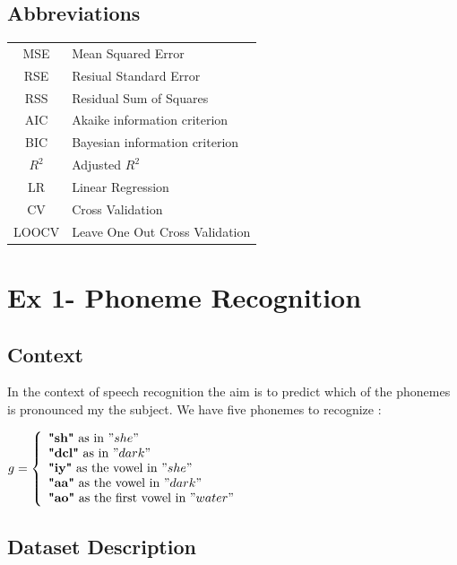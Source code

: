 \documentclass[]{report}
\begin{document}
\tableofcontents
\newpage
\section{Abbreviations}
\begin{center}
\begin{tabular}{ c| l }
	MSE & Mean Squared Error \\
	RSE & Resiual Standard Error\\ 
	RSS & Residual Sum of Squares \\
	AIC & Akaike information criterion \\
	BIC & Bayesian information criterion \\
	$R^{2}$ & Adjusted $R^{2}$ \\
	LR & Linear Regression \\
	CV & Cross Validation \\
	LOOCV & Leave One Out Cross Validation \\
	
\end{tabular}
\end{center}

\chapter{Ex 1- Phoneme Recognition}
\section{Context}
In the context of speech recognition the aim is to predict which of the phonemes is pronounced my the subject. We have five phonemes to recognize :\\ 
\begin{center}
	$g = \left\{
	\begin{array}{l}
	\textbf{"sh"} \text{ as in } "she" \\
	\textbf{"dcl"} \text{ as in } "dark" \\
	\textbf{"iy"} \text{ as the vowel in } "she" \\ 
	\textbf{"aa"} \text{ as the vowel in }  "dark"\\
	\textbf{"ao"} \text{ as the first vowel in }  "water"
	\end{array}
	\right.$
\end{center}

\section{Dataset Description}
\end{document}
